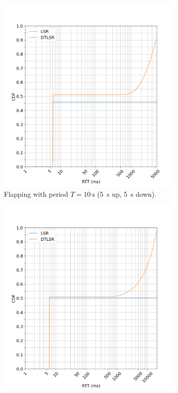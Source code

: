 \documentclass[10pt,twoside,a4paper]{article}
\begin{document}
\begin{figure}[H]
\centering
\begin{subfigure}{.5\textwidth}
  \centering
  \includegraphics[width=1\linewidth]{delay_partition_flap5}
  \caption{Flapping with period $T=\SI{10}{\s}$ (\SI{5}{\s} up, \SI{5}{\s} down).}
  \label{fig:partition_5}
\end{subfigure}%
\begin{subfigure}{.5\textwidth}
  \centering
  \includegraphics[width=1\linewidth]{delay_partition_flap20}

\end{subfigure}
\end{figure}
\end{document}
